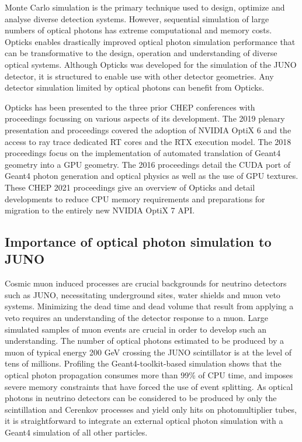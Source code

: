 \documentclass{webofc}
\begin{document}
%
Monte Carlo simulation is the primary technique used to design, optimize 
and analyse diverse detection systems. However, sequential simulation of large numbers of 
optical photons has extreme computational and memory costs. 
Opticks enables drastically improved optical photon simulation performance that can be transformative 
to the design, operation and understanding of diverse optical systems.
%
Although Opticks was developed for the simulation of the JUNO detector, it 
is structured to enable use with other detector geometries. 
Any detector simulation limited by optical photons 
can benefit from Opticks.

Opticks has been presented to the three prior CHEP conferences with proceedings
focussing on various aspects of its development. The 2019 plenary presentation 
and proceedings\cite{chep2019} covered the adoption of NVIDIA OptiX 6 and the 
access to ray trace dedicated RT cores and the RTX execution model. 
The 2018 proceedings\cite{chep2018} focus on the implementation of automated
translation of Geant4 geometry into a GPU geometry.
The 2016 proceedings\cite{chep2016} detail the CUDA port of Geant4 photon generation 
and optical physics as well as the use of GPU textures. 
%
These CHEP 2021 proceedings give an overview of Opticks and detail developments 
to reduce CPU memory requirements and preparations for migration to the 
entirely new NVIDIA OptiX 7 API.

%
%
\subsection{Importance of optical photon simulation to JUNO}%
%
%
Cosmic muon induced processes are crucial backgrounds for neutrino
detectors such as JUNO\cite{juno},
necessitating underground sites, water shields and muon veto systems.
Minimizing the dead time and dead volume that result from applying
a veto requires an understanding of the detector response to a muon.
Large simulated samples of muon events are crucial in order to
develop such an understanding.
%
The number of optical photons estimated to be produced by a muon of
typical energy 200 GeV crossing the JUNO scintillator is at the level of tens of millions.
Profiling the Geant4-toolkit-based simulation shows that the optical photon propagation 
consumes more than 99\% of CPU time, and imposes severe memory constraints that have forced
the use of event splitting.  
%
As optical photons in neutrino detectors can be considered to be produced
by only the scintillation and Cerenkov processes and yield only hits
on photomultiplier tubes, it is straightforward to integrate an
external optical photon simulation with a Geant4 simulation of all other particles.
%
\end{document}
